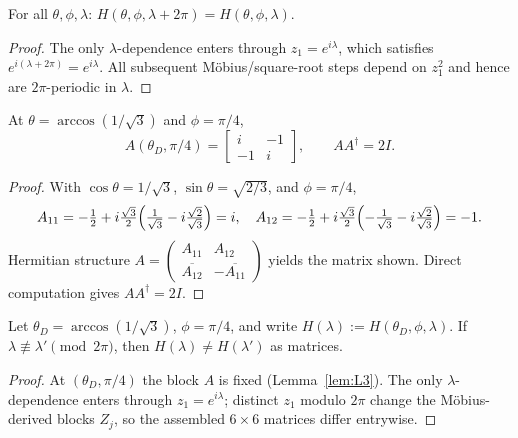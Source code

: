 \begin{lemma}
\label{lem:L2}
For all $\theta,\phi,\lambda$: $H(\theta,\phi,\lambda+2\pi)=H(\theta,\phi,\lambda)$.
\end{lemma}

\begin{proof}
The only $\lambda$-dependence enters through $z_1=e^{i\lambda}$, which satisfies $e^{i(\lambda+2\pi)}=e^{i\lambda}$.
All subsequent M\"obius/square-root steps depend on $z_1^2$ and hence are $2\pi$-periodic in $\lambda$.
\end{proof}

\begin{lemma}
\label{lem:L3}
At $\theta=\arccos(1/\sqrt3)$ and $\phi=\pi/4$,
\[
A(\theta_D,\pi/4)=
\begin{bmatrix} i & -1 \\ -1 & i \end{bmatrix},
\qquad AA^\dagger=2I.
\]
\end{lemma}

\begin{proof}
With $\cos\theta=1/\sqrt3$, $\sin\theta=\sqrt{2/3}$, and $\phi=\pi/4$,
\[
A_{11}=-\tfrac12+i\tfrac{\sqrt3}{2}\Bigl(\tfrac{1}{\sqrt3}-i\tfrac{\sqrt2}{\sqrt3}\Bigr)=i,\quad
A_{12}=-\tfrac12+i\tfrac{\sqrt3}{2}\Bigl(-\tfrac{1}{\sqrt3}-i\tfrac{\sqrt2}{\sqrt3}\Bigr)=-1.
\]
Hermitian structure $A=\begin{pmatrix}A_{11}&A_{12}\\ \overline{A_{12}}&-\overline{A_{11}}\end{pmatrix}$ yields the matrix shown.
Direct computation gives $AA^\dagger=2I$.
\end{proof}

\begin{lemma}
\label{lem:L4-matrix}
Let $\theta_D=\arccos(1/\sqrt3)$, $\phi=\pi/4$, and write $H(\lambda):=H(\theta_D,\phi,\lambda)$.
If $\lambda\not\equiv\lambda'\pmod{2\pi}$, then $H(\lambda)\neq H(\lambda')$ as matrices.
\end{lemma}

\begin{proof}
At $(\theta_D,\pi/4)$ the block $A$ is fixed (Lemma~\ref{lem:L3}).
The only $\lambda$-dependence enters through $z_1=e^{i\lambda}$; distinct $z_1$ modulo $2\pi$ change the M\"obius-derived blocks $Z_j$, so the assembled $6\times6$ matrices differ entrywise.
\end{proof}

